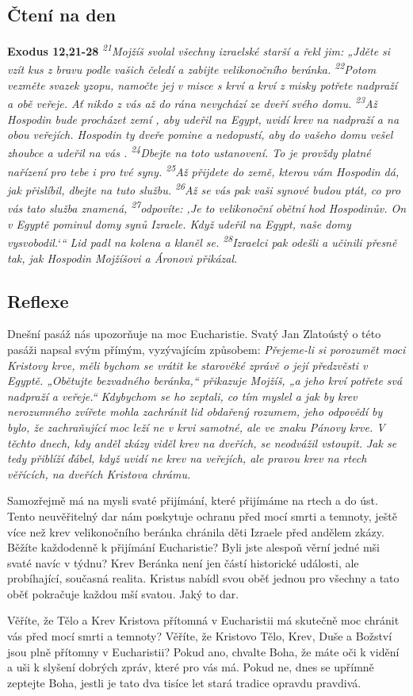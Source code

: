 \documentclass[11pt]{article}
\begin{document}
\subsection*{Čtení na den}
\textbf{Exodus 12,21-28}
\newline
\textit{
\textsuperscript{21}Mojžíš svolal všechny izraelské starší a řekl jim: „Jděte si vzít kus z bravu podle vašich čeledí a zabijte velikonočního beránka.
\textsuperscript{22}Potom vezměte svazek yzopu, namočte jej v misce s krví a krví z misky potřete nadpraží a obě veřeje. Ať nikdo z vás až do rána nevychází ze dveří svého domu.
\textsuperscript{23}Až Hospodin bude procházet zemí , aby udeřil na Egypt, uvidí krev na nadpraží a na obou veřejích. Hospodin ty dveře pomine a nedopustí, aby do vašeho domu vešel zhoubce a udeřil na vás .
\textsuperscript{24}Dbejte na toto ustanovení. To je provždy platné nařízení pro tebe i pro tvé syny.
\textsuperscript{25}Až přijdete do země, kterou vám Hospodin dá, jak přislíbil, dbejte na tuto službu.
\textsuperscript{26}Až se vás pak vaši synové budou ptát, co pro vás tato služba znamená,
\textsuperscript{27}odpovíte: ‚Je to velikonoční obětní hod Hospodinův. On v Egyptě pominul domy synů Izraele. Když udeřil na Egypt, naše domy vysvobodil.‘“ Lid padl na kolena a klaněl se.
\textsuperscript{28}Izraelci pak odešli a učinili přesně tak, jak Hospodin Mojžíšovi a Áronovi přikázal.
}

\subsection*{Reflexe}

Dnešní pasáž nás upozorňuje na moc Eucharistie. Svatý Jan Zlatoústý o této pasáži napsal svým přímým,
vyzývajícím způsobem:
\textit{Přejeme-li si porozumět moci Kristovy krve, měli bychom se vrátit ke starověké zprávě o její
předzvěsti v Egyptě. „Obětujte bezvadného beránka,“ přikazuje Mojžíš, „a jeho krví potřete
svá nadpraží a veřeje.“ Kdybychom se ho zeptali, co tím myslel a jak by krev nerozumného
zvířete mohla zachránit lid obdařený rozumem, jeho odpovědí by bylo, že zachraňující moc
leží ne v krvi samotné, ale ve znaku Pánovy krve. V těchto dnech, kdy anděl zkázy viděl krev
na dveřích, se neodvážil vstoupit. Jak se tedy přiblíží ďábel, když uvidí ne krev na veřejích, ale
pravou krev na rtech věřících, na dveřích Kristova chrámu.}

Samozřejmě má na mysli svaté přijímání, které přijímáme na rtech a do úst. Tento neuvěřitelný dar nám
poskytuje ochranu před mocí smrti a temnoty, ještě více než krev velikonočního beránka chránila děti
Izraele před andělem zkázy. Běžíte každodenně k přijímání Eucharistie? Byli jste alespoň věrní jedné mši
svaté navíc v týdnu? Krev Beránka není jen částí historické události, ale probíhající, současná realita.
Kristus nabídl svou oběť jednou pro všechny a tato oběť pokračuje každou mší svatou. Jaký to dar.

Věříte, že Tělo a Krev Kristova přítomná v Eucharistii má skutečně moc chránit vás před mocí smrti a
temnoty? Věříte, že Kristovo Tělo, Krev, Duše a Božství jsou plně přítomny v Eucharistii? Pokud ano,
chvalte Boha, že máte oči k vidění a uši k slyšení dobrých zpráv, které pro vás má. Pokud ne, dnes se
upřímně zeptejte Boha, jestli je tato dva tisíce let stará tradice opravdu pravdivá.
\end{document}
